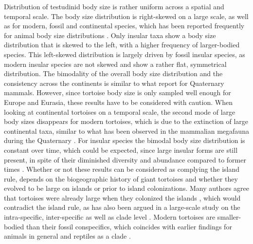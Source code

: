 Distribution of testudinid body size is rather uniform across a spatial and temporal scale.
The body size distribution is right-skewed on a large scale, as well as for modern, fossil and continental species, which has been reported frequently for animal body size distributions \citep{Blackburn1994,Kozlowski2002}.
Only insular taxa show a body size distribution that is skewed to the left, with a higher frequency of larger-bodied species. This left-skewed distribution is largely driven by fossil insular species, as modern insular species are not skewed and show a rather flat, symmetrical distribution.
The bimodality of the overall body size distribution and the consistency across the continents is similar to what \cite{Lyons2008} report for Quaternary mammals. However, since tortoise body size is only sampled well enough for Europe and Eurasia, these results have to be considered with caution.
When looking at continental tortoises on a temporal scale, the second mode of large body sizes disappears for modern tortoises, which is due to the extinction of large continental taxa, similar to what has been observed in the mammalian megafauna during the Quaternary \citep{Lyons2008}. For insular species the bimodal body size distribution is constant over time, which could be expected, since large insular forms are still present, in spite of their diminished diversity and abundance compared to former times \citep{Rhodin2015}.
Whether or not these results can be considered as complying the island rule, depends on the biogeographic history of giant tortoises and whether they evolved to be large on islands or prior to island colonizations. Many authors agree that tortoises were already large when they colonized the islands \citep{Itescu2014,Cheke2016, Gerlach2006}, which would contradict the island rule, as has also been argued in a large-scale study on the intra-specific, inter-specific as well as clade level \citep{Itescu2014}. 
Modern tortoises are smaller-bodied than their fossil conspecifics, which coincides with earlier findings for animals in general \citep{Blackburn1994} and reptiles as a clade \citep{Smith2016}.









